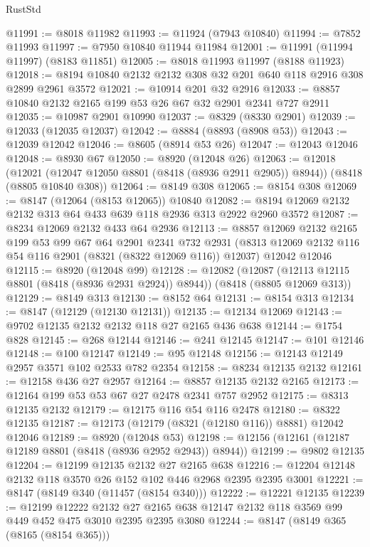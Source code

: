 \begin{lexlean}{RustStd}
\begin{coremodule}
@11991 := @8018 @11982
@11993 := @11924 (@7943 @10840)
@11994 := @7852 @11993
@11997 := @7950 @10840 @11944 @11984
@12001 := @11991 (@11994 @11997) (@8183 @11851)
@12005 := @8018 @11993 @11997 (@8188 @11923)
@12018 := @8194 @10840 @2132 @2132 @308 @32 @201 @640 @118 @2916 @308 @2899 @2961 @3572
@12021 := @10914 @201 @32 @2916
@12033 := @8857 @10840 @2132 @2165 @199 @53 @26 @67 @32 @2901 @2341 @727 @2911
@12035 := @10987 @2901 @10990
@12037 := @8329 (@8330 @2901)
@12039 := @12033 (@12035 @12037)
@12042 := @8884 (@8893 (@8908 @53))
@12043 := @12039 @12042
@12046 := @8605 (@8914 @53 @26)
@12047 := @12043 @12046
@12048 := @8930 @67
@12050 := @8920 (@12048 @26)
@12063 := @12018
    (@12021 (@12047 @12050 @8801 (@8418 (@8936 @2911 @2905)) @8944))
    (@8418 (@8805 @10840 @308))
@12064 := @8149 @308
@12065 := @8154 @308
@12069 := @8147 (@12064 (@8153 @12065)) @10840
@12082 := @8194 @12069 @2132 @2132 @313 @64 @433 @639 @118 @2936 @313 @2922 @2960 @3572
@12087 := @8234 @12069 @2132 @433 @64 @2936
@12113 := @8857
    @12069
    @2132
    @2165
    @199
    @53
    @99
    @67
    @64
    @2901
    @2341
    @732
    @2931
    (@8313 @12069 @2132 @116 @54 @116 @2901 (@8321 (@8322 @12069 @116)) @12037)
    @12042
    @12046
@12115 := @8920 (@12048 @99)
@12128 := @12082
    (@12087 (@12113 @12115 @8801 (@8418 (@8936 @2931 @2924)) @8944))
    (@8418 (@8805 @12069 @313))
@12129 := @8149 @313
@12130 := @8152 @64
@12131 := @8154 @313
@12134 := @8147 (@12129 (@12130 @12131))
@12135 := @12134 @12069
@12143 := @9702 @12135 @2132 @2132 @118 @27 @2165 @436 @638
@12144 := @1754 @828
@12145 := @268 @12144
@12146 := @241 @12145
@12147 := @101 @12146
@12148 := @100 @12147
@12149 := @95 @12148
@12156 := @12143 @12149 @2957 @3571 @102 @2533 @782 @2354
@12158 := @8234 @12135 @2132
@12161 := @12158 @436 @27 @2957
@12164 := @8857 @12135 @2132 @2165
@12173 := @12164 @199 @53 @53 @67 @27 @2478 @2341 @757 @2952
@12175 := @8313 @12135 @2132
@12179 := @12175 @116 @54 @116 @2478
@12180 := @8322 @12135
@12187 := @12173 (@12179 (@8321 (@12180 @116)) @8881) @12042 @12046
@12189 := @8920 (@12048 @53)
@12198 := @12156 (@12161 (@12187 @12189 @8801 (@8418 (@8936 @2952 @2943)) @8944))
@12199 := @9802 @12135
@12204 := @12199 @12135 @2132 @27 @2165 @638
@12216 := @12204 @12148 @2132 @118 @3570 @26 @152 @102 @446 @2968 @2395 @2395 @3001
@12221 := @8147 (@8149 @340 (@11457 (@8154 @340)))
@12222 := @12221 @12135
@12239 := @12199
    @12222
    @2132
    @27
    @2165
    @638
    @12147
    @2132
    @118
    @3569
    @99
    @449
    @452
    @475
    @3010
    @2395
    @2395
    @3080
@12244 := @8147 (@8149 @365 (@8165 (@8154 @365)))

\end{coremodule}
\end{lexlean}
